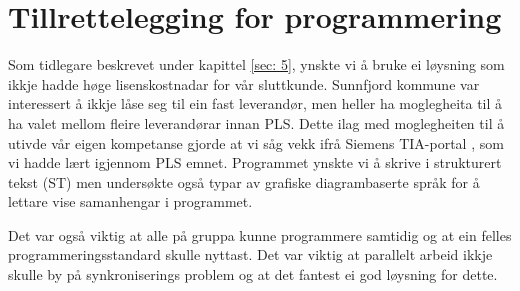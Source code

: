 \chapter{Tillrettelegging for programmering}
\thispagestyle{fancy}
\label{sec:7} 

Som tidlegare beskrevet under kapittel \ref{sec: 5}, ynskte vi å bruke ei løysning som ikkje hadde høge lisenskostnadar for vår sluttkunde. 
Sunnfjord kommune var interessert å ikkje låse seg til ein fast leverandør, men heller ha moglegheita til å ha valet mellom fleire 
leverandørar innan \gls{PLS}. Dette ilag med moglegheiten til å utivde vår eigen kompetanse 
gjorde at vi såg vekk ifrå Siemens \gls{TIA}-portal \citep{Siemens}, som vi hadde lært igjennom \gls{PLS} emnet.
Programmet ynskte vi å skrive i strukturert tekst (\gls{ST}) men undersøkte også 
typar av grafiske diagrambaserte språk for å lettare vise samanhengar i programmet.

Det var også viktig at alle på gruppa kunne programmere samtidig og at ein felles programmeringsstandard skulle nyttast.
Det var viktig at parallelt arbeid ikkje skulle by på synkroniserings problem og at det fantest ei god løysning for dette.

